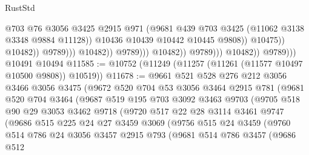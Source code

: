 \begin{lexlean}{RustStd}
\begin{coremodule}
                                                    @703
                                                    @76
                                                    @3056
                                                    @3425
                                                    @2915
                                                    @971
                                                    (@9681
                                                      @439
                                                      @703
                                                      @3425
                                                      (@11062 @3138 @3348 @9884 @11128))
                                                    @10436
                                                    @10439
                                                    @10442
                                                    @10445
                                                    @9808))
                                                @10475))
                                            @10482))
                                        @9789)))
                                  @10482))
                              @9789)))
                        @10482))
                    @9789)))
              @10482))
          @9789)))
    @10491
    @10494
@11585 := @10752 (@11249 (@11257 (@11261 (@11577 @10497 @10500 @9808)) @10519))
@11678 := @9661
    @521
    @528
    @276
    @212
    @3056
    @3466
    @3056
    @3475
    (@9672
      @520
      @704
      @53
      @3056
      @3464
      @2915
      @781
      (@9681
        @520
        @704
        @3464
        (@9687
          @519
          @195
          @703
          @3092
          @3463
          @9703
          (@9705
            @518
            @90
            @29
            @3053
            @3462
            @9718
            (@9720
              @517
              @22
              @28
              @3114
              @3461
              @9747
              (@9686
                @515
                @225
                @24
                @27
                @3459
                @3069
                (@9756
                  @515
                  @24
                  @3459
                  (@9760
                    @514
                    @786
                    @24
                    @3056
                    @3457
                    @2915
                    @793
                    (@9681
                      @514
                      @786
                      @3457
                      (@9686
                        @512

\end{coremodule}
\end{lexlean}
